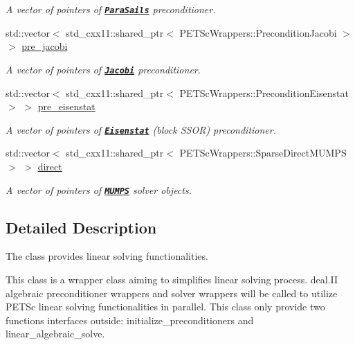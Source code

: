 \begin{DoxyCompactItemize}
\begin{DoxyCompactList}\small\item\em A vector of pointers of \href{https://www.dealii.org/8.5.0/doxygen/deal.II/classPETScWrappers_1_1PreconditionParaSails.html}{\tt {\bfseries Para\+Sails}} preconditioner. \end{DoxyCompactList}\item 
std\+::vector$<$ std\+\_\+cxx11\+::shared\+\_\+ptr$<$ P\+E\+T\+Sc\+Wrappers\+::\+Precondition\+Jacobi $>$ $>$ \hyperlink{class_preconditioner_solver_ab2379323cfbca020045ec5dd4ab708dc}{pre\+\_\+jacobi}
\begin{DoxyCompactList}\small\item\em A vector of pointers of \href{https://www.dealii.org/8.5.0/doxygen/deal.II/classPETScWrappers_1_1PreconditionJacobi.html}{\tt {\bfseries Jacobi}} preconditioner. \end{DoxyCompactList}\item 
std\+::vector$<$ std\+\_\+cxx11\+::shared\+\_\+ptr$<$ P\+E\+T\+Sc\+Wrappers\+::\+Precondition\+Eisenstat $>$ $>$ \hyperlink{class_preconditioner_solver_aab4bd157aebca7681283ff6cf0e69392}{pre\+\_\+eisenstat}
\begin{DoxyCompactList}\small\item\em A vector of pointers of \href{https://www.dealii.org/8.5.0/doxygen/deal.II/classPETScWrappers_1_1PreconditionEisenstat.html}{\tt {\bfseries Eisenstat}} (block S\+S\+OR) preconditioner. \end{DoxyCompactList}\item 
std\+::vector$<$ std\+\_\+cxx11\+::shared\+\_\+ptr$<$ P\+E\+T\+Sc\+Wrappers\+::\+Sparse\+Direct\+M\+U\+M\+PS $>$ $>$ \hyperlink{class_preconditioner_solver_acd3bde261fb29c50e15ffe6ecd78ee5f}{direct}
\begin{DoxyCompactList}\small\item\em A vector of pointers of \href{https://www.dealii.org/8.5.0/doxygen/deal.II/classPETScWrappers_1_1SparseDirectMUMPS.html}{\tt {\bfseries M\+U\+M\+PS}} solver objects. \end{DoxyCompactList}\end{DoxyCompactItemize}


\subsection{Detailed Description}
The class provides linear solving functionalities. 

This class is a wrapper class aiming to simplifies linear solving process. deal.\+II algebraic preconditioner wrappers and solver wrappers will be called to utilize P\+E\+T\+Sc linear solving functionalities in parallel. This class only provide two functions interfaces outside\+: initialize\+\_\+preconditioners and linear\+\_\+algebraic\+\_\+solve.

